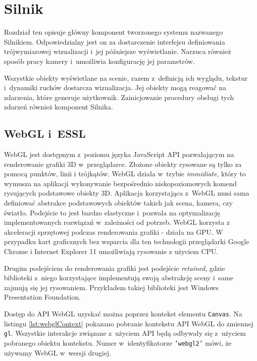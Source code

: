 \chapter{Silnik}

Rozdział ten opisuje główny komponent tworzonego systemu nazwanego Silnikiem. Odpowiedzialny jest on za dostarczenie interfejsu definiowania trójwymiarowej wizualizacji i~jej późniejsze wyświetlanie. Narzuca również sposób pracy kamery i~umożliwia konfigurację jej parametrów.

Wszystkie obiekty wyświetlane na scenie, razem z~definicją ich wyglądu, tekstur i~dynamiki ruchów dostarcza wizualizacja. Jej obiekty mogą reagować na zdarzenia, które generuje użytkownik. Zainicjowanie procedury obsługi tych zdarzeń również komponent Silnika.

\section{WebGL i~ESSL}

WebGL jest dostępnym z~poziomu języka JavaScript API pozwalającym na renderowanie grafiki 3D w~przeglądarce. Złożone obiekty rysowane są tylko za pomocą punktów, linii i trójkątów.  WebGL działa w~trybie \textit{immidiate}, który to wymusza na aplikacji wykonywanie bezpośrednio niskopoziomowych komend rysujących podstawowe obiekty 3D. Aplikacja korzystająca z~WebGL musi sama definiować abstrakce podstawowych obiektów takich jak scena, kamera, czy światło. Podejście to jest bardzo elastyczne i~pozwala na optymalizację implementowanych rozwiązań w~zależności od potrzeb\cite[Rozdział 1]{RealTime3DGraphics}. WebGL korzysta z akceleracji sprzętowej podczas renderowania grafiki - działa na GPU. W przypadku kart graficznych bez wsparcia dla ten technologii przeglądarki Google Chrome i Internet Explorer 11 umożliwiają rysowanie z użyciem CPU.

Drugim podejściem do renderowania grafiki jest podejście \textit{retained}, gdzie biblioteki z~niego korzystające implementują swoją abstrakcję sceny i~same zajmują się jej rysowaniem. Przykładem takiej biblioteki jest Windows Presentation Foundation\cite{WPF}.

Dostęp do API WebGL uzyskać można poprzez kontekst elementu \texttt{Canvas}. Na listingu \ref{lst:webglContext} pokazano pobranie kontekstu API WebGL do zmiennej \texttt{gl}. Wszystkie interakcje związane z~użyciem API będą odbywały się z~użyciem pobranego obiektu kontekstu. Numer w~identyfikatorze \texttt{’webgl2’} mówi, że używamy WebGL w~wersji drugiej.

